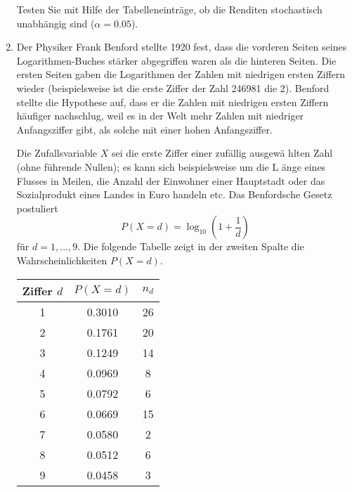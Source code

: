 \begin{enumerate}
Testen Sie mit Hilfe der Tabelleneintr\"{a}ge, ob die Renditen stochastisch
unabh\"{a}ngig sind ($\alpha =0.05$).

\item Der Physiker Frank Benford stellte 1920 fest, dass die vorderen Seiten
seines Logarithmen-Buches st\"{a}rker abgegriffen waren als die hinteren
Seiten. Die ersten Seiten gaben die Logarithmen der Zahlen mit niedrigen
ersten Ziffern wieder (beispielsweise ist die erste Ziffer der Zahl 246981
die 2). Benford stellte die Hypothese auf, dass er die Zahlen mit niedrigen
ersten Ziffern h\"{a}ufiger nachschlug, weil es in der Welt mehr Zahlen mit
niedriger Anfangsziffer gibt, als solche mit einer hohen Anfangsziffer.

Die Zufallsvariable $X$ sei die erste Ziffer einer zuf\"{a}llig ausgew\"{a}%
hlten Zahl (ohne f\"{u}hrende Nullen); es kann sich beispielsweise um die L%
\"{a}nge eines Flusses in Meilen, die Anzahl der Einwohner einer Hauptstadt
oder das Sozialprodukt eines Landes in Euro handeln etc. Das Benfordsche
Gesetz postuliert 
\begin{equation*}
P\left( X=d\right) =\log _{10}\left( 1+\frac{1}{d}\right)
\end{equation*}%
f\"{u}r $d=1,\ldots ,9$. Die folgende Tabelle zeigt in der zweiten Spalte
die Wahrscheinlichkeiten $P\left( X=d\right) $.

\begin{center}%
\begin{tabular}{|c|c|c|}
\hline
Ziffer $d$ & $P\left( X=d\right) $ & $n_{d}$ \\ \hline\hline
1 & 0.3010 & 26 \\ \hline
2 & 0.1761 & 20 \\ \hline
3 & 0.1249 & 14 \\ \hline
4 & 0.0969 & 8 \\ \hline
5 & 0.0792 & 6 \\ \hline
6 & 0.0669 & 15 \\ \hline
7 & 0.0580 & 2 \\ \hline
8 & 0.0512 & 6 \\ \hline
9 & 0.0458 & 3 \\ \hline
\end{tabular}
\end{center}%


\end{enumerate}
